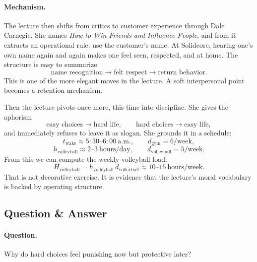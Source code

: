 \paragraph{Mechanism.}
The lecture then shifts from critics to customer experience through Dale Carnegie. She names \emph{How to Win Friends and Influence People}, and from it extracts an operational rule: use the customer's name. At Solidcore, hearing one's own name again and again makes one feel seen, respected, and at home. The structure is easy to summarize:
\begin{equation}
\text{name recognition}
\to
\text{felt respect}
\to
\text{return behavior}.
\end{equation}
This is one of the more elegant moves in the lecture. A soft interpersonal point becomes a retention mechanism.

Then the lecture pivots once more, this time into discipline. She gives the aphorism
\begin{equation}
\text{easy choices} \to \text{hard life},
\qquad
\text{hard choices} \to \text{easy life},
\end{equation}
and immediately refuses to leave it as slogan. She grounds it in a schedule:
\begin{equation}
t_{\text{wake}} \approx 5{:}30\text{--}6{:}00\ \text{a.m.},
\qquad
d_{\text{gym}} = 6/\text{week},
\end{equation}
\begin{equation}
h_{\text{volleyball}} \approx 2\text{--}3\ \text{hours/day},
\qquad
d_{\text{volleyball}} = 5/\text{week}.
\end{equation}
From this we can compute the weekly volleyball load:
\begin{equation}
H_{\text{volleyball}}
=
h_{\text{volleyball}}\,d_{\text{volleyball}}
\approx
10\text{--}15\ \text{hours/week}.
\end{equation}
That is not decorative exercise. It is evidence that the lecture's moral vocabulary is backed by operating structure.

\subsection{Question \& Answer}

\paragraph{Question.}
Why do hard choices feel punishing now but protective later?

